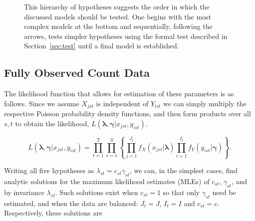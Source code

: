 \documentclass[12pt]{article}
\begin{document}
\begin{figure}
  \centering
  
  \caption{This hierarchy of hypotheses suggests the order in which the discussed models should be tested.  One begins with the most complex models at the bottom and sequentially, following the arrows, tests simpler hypotheses using the formal test described in Section~\ref{sec:test} until a final model is established.}
  \label{fig:hier}
\end{figure}

\subsection{Fully Observed Count Data}
\label{sec:count}

The likelihood function that allows for estimation of these parameters is as follows.  Since we assume $X_{jst}$ is independent of $Y_{ist}$ we can simply multiply the respective Poisson probability density functions, and then form products over all $s,t$ to obtain the likelihood, $L( \boldsymbol{\lambda}, \boldsymbol{\gamma} | x_{jst}, y_{ist})$.  

\begin{equation}
  \label{eq:likelihood}
 L( \boldsymbol{\lambda}, \boldsymbol{\gamma} | x_{jst}, y_{ist}) = \prod_{t = 1}^{T} \prod_{s=1}^S \left\{ \prod_{j=1}^{J_t} f_X(x_{jst}|\boldsymbol{\lambda}) \prod_{i=1}^{I_t} f_Y(y_{ist} | \boldsymbol{\gamma}) \right\}.
\end{equation}

\noindent Writing all five hypotheses as $\lambda_{st} = c_{st}\gamma_{st}$, we can, in the simplest cases, find analytic solutions for the maximum likelihood estimates (MLEs) of $c_{st}$, $\gamma_{st}$, and by invariance $\lambda_{st}$.  Such solutions exist when $c_{st} = 1$ so that only $\gamma_{st}$ need be estimated, and when the data are balanced: $J_t = J$, $I_t = I$ and $c_{st} = c$.  Respectively, these solutions are
\end{document}
